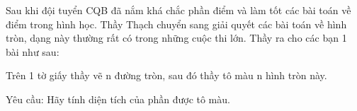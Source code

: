 Sau khi đội tuyển CQB đã nắm khá chắc phần điểm và làm tốt các bài toán về điểm trong hình học. Thầy Thạch chuyển sang giải quyết các bài toán về hình tròn, dạng này thường rất có trong những cuộc thi lớn. Thầy ra cho các bạn 1 bài như sau:  

   Trên 1 tờ giấy thầy vẽ n đường tròn, sau đó thầy tô màu n hình tròn này.  

   Yêu cầu: Hãy tính diện tích của phần được tô màu.  

\